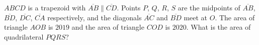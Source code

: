 $ABCD$ is a trapezoid with $\overline{AB}\parallel\overline{CD}$. Points $P$, $Q$, $R$, $S$ are the midpoints of $\overline{AB}$, $\overline{BD}$, $\overline{DC}$, $\overline{CA}$ respectively, and the diagonals $\overline{AC}$ and $\overline{BD}$ meet at $O$. The area of triangle $AOB$ is $2019$ and the area of triangle $COD$ is $2020$. What is the area of quadrilateral $PQRS$?
